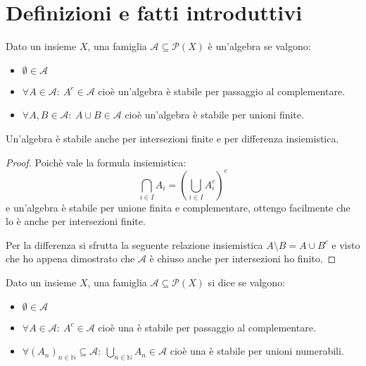 \section{Definizioni e fatti introduttivi}
\begin{definition}[Algebra]
	Dato un insieme $X$, una famiglia $\mathcal A\subseteq\mathcal P(X)$ è un'algebra se valgono:
	\begin{itemize}
		\item $\emptyset\in\mathcal A$
		\item $\forall A\in\mathcal A:\ A^c\in\mathcal A$ cioè un'algebra è stabile per passaggio al complementare.
		\item $\forall A,B\in\mathcal A:\ A\cup B\in\mathcal A$ cioè un'algebra è stabile per unioni finite.
	\end{itemize}
\end{definition}
\begin{remark}\label{ProprietaAlg}
	Un'algebra è stabile anche per intersezioni finite e per differenza insiemistica.
\end{remark}
\begin{proof}
	Poichè vale la formula insiemistica:
	\begin{equation*}
		\bigcap_{i\in I} A_i = \left( \bigcup_{i\in I} A_i^c \right)^c
	\end{equation*}
	e un'algebra è stabile per unione finita e complementare, ottengo facilmente che lo è anche per intersezioni finite.
	
	Per la differenza si sfrutta la seguente relazione insiemistica $A\setminus B=A\cup B^c$ e visto che ho appena dimostrato che $\mathcal A$ è chiuso anche per intersezioni ho finito.
\end{proof}


\begin{definition}[\sigalg{}]
	Dato un insieme $X$, una famiglia $\mathcal A\subseteq\mathcal P (X)$ si dice \sigalg{} se valgono:
	\begin{itemize}
	\item $\emptyset\in \mathcal A$
	\item $\forall A\in \mathcal A:\ A^c\in \mathcal A$ cioè una \sigalg{} è stabile per passaggio al complementare.
	\item $\forall (A_n)_{n\in\mathbb N}\subseteq \mathcal A:\ \bigcup_{n\in\mathbb N} A_n\in \mathcal A$ cioè una \sigalg{} è stabile per unioni numerabili.  
	\end{itemize}
\end{definition}

